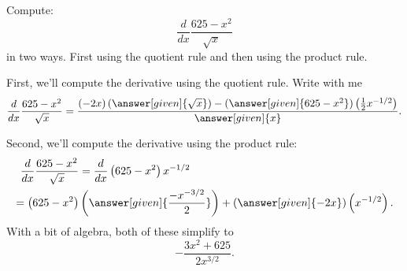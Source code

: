 \documentclass{ximera}
\begin{document}
\begin{example}
Compute: 
\[
\frac{d}{dx} \frac{625-x^2}{\sqrt{x}}
\] 
in two ways. First using the quotient rule and then using the product
rule.
\begin{explanation}
First, we'll compute the derivative using the quotient rule. Write with me
\[
\frac{d}{dx} \frac{625-x^2}{\sqrt{x}} = \frac{\left(-2x\right)\left(\answer[given]{\sqrt{x}}\right) - (\answer[given]{625-x^2})\left(\frac{1}{2}x^{-1/2}\right)}{\answer[given]{x}}.
\]

Second, we'll compute the derivative using the product rule:
\begin{align*}
\frac{d}{dx} \frac{625-x^2}{\sqrt{x}} &= \frac{d}{dx} \left(625-x^2\right)x^{-1/2}\\
=\left(625-x^2\right)&\left(\answer[given]{\frac{-x^{-3/2}}{2}}\right)+ (\answer[given]{-2x})\left(x^{-1/2}\right).
\end{align*}
With a bit of algebra, both of these simplify to
\[
-\frac{3x^2+625}{2x^{3/2}}.
\]
\end{explanation}
\end{example}
\end{document}
